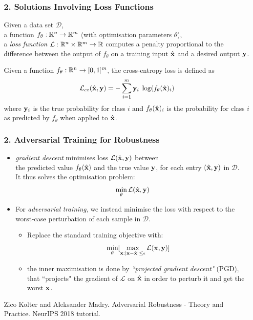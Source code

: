 \documentclass[aspectratio=169]{beamer}
\newcommand{\distance}[2]{|#1 - #2|}
\newcommand{\xs}{\x} 			%
\begin{document}
\begin{frame}
  \frametitle{2. Solutions Involving Loss Functions}
Given a data set $\mathcal{D} $,\\  a function  ${f_{\theta}: {\mathbb R}^n \rightarrow {\mathbb R}^m}$ (with optimisation parameters $\theta$),\\
	a \emph{loss function} $\mathcal{L}: {\mathbb R}^n \times {\mathbb R}^m \rightarrow {\mathbb R}$ computes a penalty proportional to the difference between the output of $f_{\theta}$ on a training input $\hat{\mathbf{x}}$ and a desired output $\mathbf{y}$.\pause


\begin{example}
	\label{eq:cross-entropy}
	Given a function  ${f_{\theta}: {\mathbb R}^n \rightarrow [0,1]^m}$, the cross-entropy loss is defined as
	\begin{equation}\label{eq:ce}
	\mathcal{L}_{ce}(\hat{\mathbf{x}}, \mathbf{y}) = - \sum_{i=1}^{m} \mathbf{y}_i \; \log(f_{\theta}(\hat{\mathbf{x}})_i)
	\end{equation}
	where $\mathbf{y}_i$ is the true probability for class $i$ and $f_{\theta}(\hat{\mathbf{x}})_i$ is the probability for class $i$ as predicted by $f_{\theta}$ when applied to $\hat{\mathbf{x}}$.
\end{example}

\end{frame}



\begin{frame}
  \frametitle{2. Adversarial Training  for Robustness}

  \begin{itemize}
  \item  \emph{gradient descent}  minimises loss $\mathcal{L}(\hat{\mathbf{x}}, \mathbf{y})$ between\\ the predicted value $f_{\theta}(\hat{\mathbf{x}})$ and the true value $\mathbf{y}$, for each entry $(\hat{\mathbf{x}}, \mathbf{y})$ in $\mathcal{D}$.\\ It thus solves the optimisation problem:
  $$ \min_{\theta} \mathcal{L}(\hat{\mathbf{x}}, \mathbf{y}) $$
  \pause
  \item For \emph{adversarial training}, we instead minimise the loss with respect to the worst-case perturbation of each sample in $\mathcal{D}$.
\begin{itemize}
     \item Replace the standard training objective with:
$$\min_{\theta} [ \max_{\xs : \distance{\xs}{\xt} \leq \epsilon} \lossfn(\xs, \y)]$$
 \item the inner maximisation is done by \emph{``projected gradient descent"} (PGD), that ``projects" the gradient of $\mathcal{L}$ on $\hat{\mathbf{x}}$ in order to perturb it and get the worst $\xs$.

\end{itemize}
\end{itemize}

 {\scriptsize
   \begin{thebibliography}{99}
        \beamertemplatearticlebibitems
    Zico Kolter and Aleksander Madry. Adversarial Robustness - Theory and Practice. NeurIPS 2018 tutorial.

 \end{thebibliography}}

\end{frame}
\end{document}
